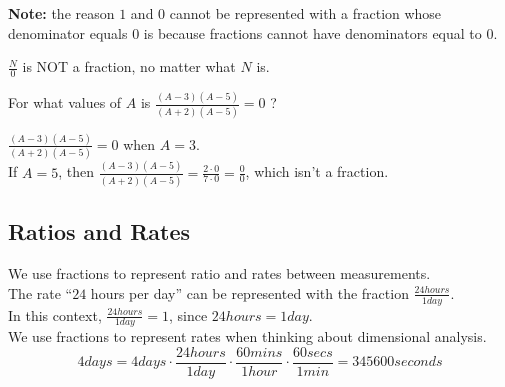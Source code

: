 \documentclass{ximera}
\begin{document}
\textbf{Note:} the reason $1$ and $0$ cannot be represented with a fraction whose denominator equals $0$ is because fractions cannot have denominators equal to $0$.






\begin{warning}


$\frac{N}{0}$ is NOT a fraction, no matter what $N$ is.



\end{warning}




\begin{example}


For what values of $A$ is  $\frac{(A-3)(A-5)}{(A+2)(A-5)} = 0$ ?


\begin{explanation}

$\frac{(A-3)(A-5)}{(A+2)(A-5)} = 0$ when $A = 3$. \\


If $A = 5$, then $\frac{(A-3)(A-5)}{(A+2)(A-5)} = \frac{2\cdot0}{7\cdot0} = \frac{0}{0}$, which isn't a fraction.



\end{explanation}


\end{example}



\subsection*{Ratios and Rates}


We use fractions to represent ratio and rates between measurements. \\




The rate  ``$24$ hours per day'' can be represented with the fraction $\frac{24 hours}{1 day}$. \\



In this context, $\frac{24 hours}{1 day} = 1$, since $24 hours = 1 day$. \\


We use fractions to represent rates when thinking about dimensional analysis. \\





\[
4 days = 4 days \cdot \frac{24 hours}{1 day} \cdot \frac{60 mins}{1 hour} \cdot \frac{60 secs}{1 min} = 345600 seconds
\]
\end{document}
